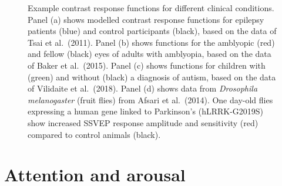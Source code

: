\documentclass[
  letterpaper,
  DIV=11,
  numbers=noendperiod]{scrartcl}
\begin{document}
\begin{figure}


\caption{\label{fig-plotclinical}Example contrast response functions for
different clinical conditions. Panel (a) shows modelled contrast
response functions for epilepsy patients (blue) and control participants
(black), based on the data of Tsai et al.~(2011). Panel (b) shows
functions for the amblyopic (red) and fellow (black) eyes of adults with
amblyopia, based on the data of Baker et al.~(2015). Panel (c) shows
functions for children with (green) and without (black) a diagnosis of
autism, based on the data of Vilidaite et al.~(2018). Panel (d) shows
data from \emph{Drosophila melanogaster} (fruit flies) from Afsari et
al.~(2014). One day-old flies expressing a human gene linked to
Parkinson's (hLRRK-G2019S) show increased SSVEP response amplitude and
sensitivity (red) compared to control animals (black).}

\end{figure}%

\section{Attention and arousal}\label{attention-and-arousal}
\end{document}
